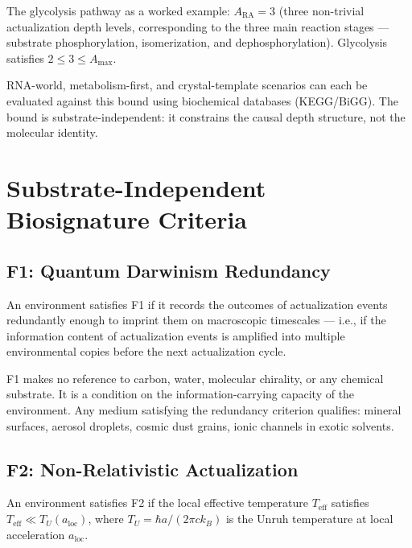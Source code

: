 \documentclass[12pt,a4paper]{article}
\begin{document}
The glycolysis pathway as a worked example: $A_{\mathrm{RA}} = 3$ (three non-trivial actualization depth levels, corresponding to the three main reaction stages — substrate phosphorylation, isomerization, and dephosphorylation).  Glycolysis satisfies $2 \leq 3 \leq A_{\mathrm{max}}$.

RNA-world, metabolism-first, and crystal-template scenarios can each be evaluated against this bound using biochemical databases (KEGG/BiGG).  The bound is substrate-independent: it constrains the causal depth structure, not the molecular identity.

\section{Substrate-Independent Biosignature Criteria}

\subsection{F1: Quantum Darwinism Redundancy}

\begin{definition}[Condition F1]
An environment satisfies F1 if it records the outcomes of actualization events redundantly enough to imprint them on macroscopic timescales — i.e., if the information content of actualization events is amplified into multiple environmental copies before the next actualization cycle.
\end{definition}

F1 makes no reference to carbon, water, molecular chirality, or any chemical substrate.  It is a condition on the information-carrying capacity of the environment.  Any medium satisfying the redundancy criterion qualifies: mineral surfaces, aerosol droplets, cosmic dust grains, ionic channels in exotic solvents.

\subsection{F2: Non-Relativistic Actualization}

\begin{definition}[Condition F2]
An environment satisfies F2 if the local effective temperature $T_{\mathrm{eff}}$ satisfies $T_{\mathrm{eff}} \ll T_U(a_{\mathrm{loc}})$, where $T_U = \hbar a/(2\pi c k_B)$ is the Unruh temperature at local acceleration $a_{\mathrm{loc}}$.
\end{definition}
\end{document}
